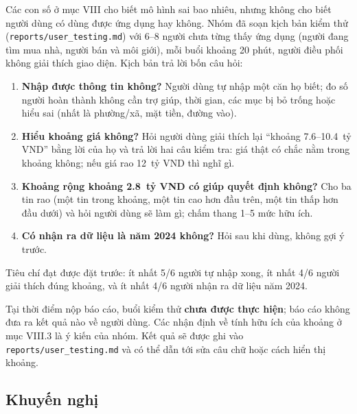 \documentclass[11pt]{article}
\newcommand{\ty}{tỷ VND}
\begin{document}
Các con số ở mục VIII cho biết mô hình sai bao nhiêu, nhưng không cho biết người dùng có dùng được ứng dụng hay
không. Nhóm đã soạn kịch bản kiểm thử (\nolinkurl{reports/user_testing.md}) với 6--8 người chưa từng thấy ứng dụng
(người đang tìm mua nhà, người bán và môi giới), mỗi buổi khoảng 20 phút, người điều phối không giải thích giao diện.
Kịch bản trả lời bốn câu hỏi:
\begin{enumerate}
    \item \textbf{Nhập được thông tin không?} Người dùng tự nhập một căn họ biết; đo số người hoàn thành không cần
          trợ giúp, thời gian, các mục bị bỏ trống hoặc hiểu sai (nhất là phường/xã, mặt tiền, đường vào).
    \item \textbf{Hiểu khoảng giá không?} Hỏi người dùng giải thích lại ``khoảng 7.6--10.4~\ty'' bằng lời của họ và
          trả lời hai câu kiểm tra: giá thật có chắc nằm trong khoảng không; nếu giá rao 12~\ty{} thì nghĩ gì.
    \item \textbf{Khoảng rộng khoảng 2.8~\ty{} có giúp quyết định không?} Cho ba tin rao (một tin trong khoảng, một tin
          cao hơn đầu trên, một tin thấp hơn đầu dưới) và hỏi người dùng sẽ làm gì; chấm thang 1--5 mức hữu ích.
    \item \textbf{Có nhận ra dữ liệu là năm 2024 không?} Hỏi sau khi dùng, không gợi ý trước.
\end{enumerate}
Tiêu chí đạt được đặt trước: ít nhất 5/6 người tự nhập xong, ít nhất 4/6 người giải thích đúng khoảng, và ít nhất
4/6 người nhận ra dữ liệu năm 2024.

\begin{warnbox}
Tại thời điểm nộp báo cáo, buổi kiểm thử \textbf{chưa được thực hiện}; báo cáo không đưa ra kết quả nào về người
dùng. Các nhận định về tính hữu ích của khoảng ở mục VIII.3 là ý kiến của nhóm. Kết quả sẽ được ghi vào
\nolinkurl{reports/user_testing.md} và có thể dẫn tới sửa câu chữ hoặc cách hiển thị khoảng.
\end{warnbox}

\subsection{Khuyến nghị}
\end{document}
